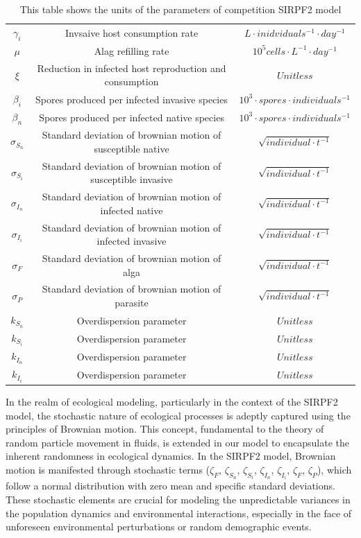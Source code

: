 \documentclass[12pt]{article}
\begin{document}
\begin{table}[H]
{\begin{tabular}{||c|c |c||}
$\gamma_i$ & Invsaive host consumption rate&$L \cdot inidviduals^{-1} \cdot day ^{-1} $ \\
$\mu$ & Alag refilling rate&$10^5 cells \cdot L ^{-1} \cdot day^{-1}$ \\
$\xi$ &Reduction in infected host reproduction and consumption& $Unitless$ \\
$\beta_i$ & Spores produced per infected invasive species&$10^3 \cdot spores \cdot individuals^{-1} $ \\
$\beta_n$ & Spores produced per infected native species&$10^3 \cdot spores \cdot individuals^{-1} $ \\
$\sigma_{S_n}$ & Standard deviation of brownian motion of susceptible native&$\sqrt{individual \cdot t^{-1}}$ \\
$\sigma_{S_i}$ & Standard deviation of brownian motion of susceptible invasive &$\sqrt{individual \cdot t^{-1}}$ \\
$\sigma_{I_n}$ & Standard deviation of brownian motion of infected native&$\sqrt{individual \cdot t^{-1}}$ \\
$\sigma_{I_i}$ & Standard deviation of brownian motion of infected invasive&$\sqrt{individual \cdot t^{-1}}$ \\
$\sigma_{F}$ & Standard deviation of brownian motion of alga&$\sqrt{individual \cdot t^{-1}}$ \\
$\sigma_{P}$ &Standard deviation of brownian motion of parasite &$\sqrt{individual \cdot t^{-1}}$ \\
$k_{S_n}$ & Overdispersion parameter& $Unitless$ \\
$k_{S_i}$ &Overdispersion parameter &$Unitless$ \\
$k_{I_n}$ &Overdispersion parameter &$Unitless$ \\
$k_{I_i}$ & Overdispersion parameter&$Unitless$ \\[1ex]
 \hline
\end{tabular}}
\caption{This table shows the units of the parameters of competition SIRPF2 model}
\label{Table:1}
\end{table}

\renewcommand{\arraystretch}{1}
In the realm of ecological modeling, particularly in the context of the SIRPF2 model, the stochastic nature of ecological processes is adeptly captured using the principles of Brownian motion. This concept, fundamental to the theory of random particle movement in fluids, is extended in our model to encapsulate the inherent randomness in ecological dynamics. In the SIRPF2 model, Brownian motion is manifested through stochastic terms ($\zeta_F$, $\zeta_{S_n}$, $\zeta_{S_i}$, $\zeta_{I_n}$, $\zeta_{I_i}$, $\zeta_{F}$, $\zeta_P$), which follow a normal distribution with zero mean and specific standard deviations. These stochastic elements are crucial for modeling the unpredictable variances in the population dynamics and environmental interactions, especially in the face of unforeseen environmental perturbations or random demographic events.\\
\end{document}

